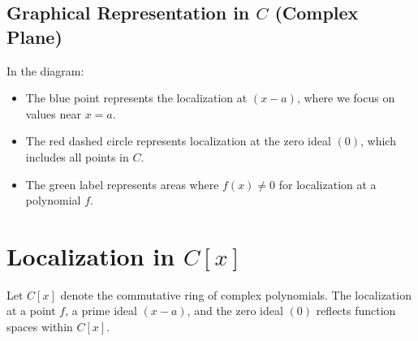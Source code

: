 \documentclass[11pt,openany]{article}
\begin{document}
\subsection*{Graphical Representation in \( C \) (Complex Plane)}

\begin{center}
\end{center}

In the diagram:
\begin{itemize}
	\item The blue point represents the localization at \( (x - a) \), where we focus on values near \( x = a \).
	\item The red dashed circle represents localization at the zero ideal \( (0) \), which includes all points in \( C \).
	\item The green label represents areas where \( f(x) \neq 0 \) for localization at a polynomial \( f \).
\end{itemize}
\newpage

\section*{Localization in \( C[x] \)}

Let \( C[x] \) denote the commutative ring of complex polynomials. The localization at a point \( f \), a prime ideal \( (x-a) \), and the zero ideal \( (0) \) reflects function spaces within \( C[x] \).
\end{document}
